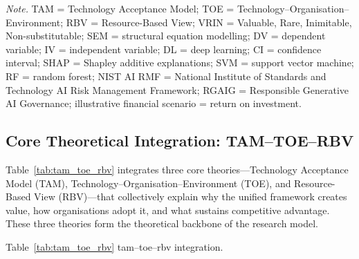 \vspace{0.5em}
\noindent\textit{Note.} TAM = Technology Acceptance Model; TOE = Technology--Organisation--Environment; RBV = Resource-Based View; VRIN = Valuable, Rare, Inimitable, Non-substitutable; SEM = structural equation modelling; DV = dependent variable; IV = independent variable; DL = deep learning; CI = confidence interval; SHAP = Shapley additive explanations; SVM = support vector machine; RF = random forest; NIST AI RMF = National Institute of Standards and Technology AI Risk Management Framework; RGAIG = Responsible Generative AI Governance; illustrative financial scenario = return on investment.
\fi %

\label{sec:theoretical_statistical}
\label{tab:theory_stats_summary}
\label{tab:tam_toe_rbv}
\label{tab:statistical_methods}

\iffalse %
\subsection{Core Theoretical Integration: TAM--TOE--RBV}

Table~\ref{tab:tam_toe_rbv} integrates three core theories---Technology Acceptance Model (TAM), Technology--Organisation--Environment (TOE), and Resource-Based View (RBV)---that collectively explain why the unified framework creates value, how organisations adopt it, and what sustains competitive advantage. These three theories form the theoretical backbone of the research model.


\noindent Table~\ref{tab:tam_toe_rbv} tam--toe--rbv integration.

